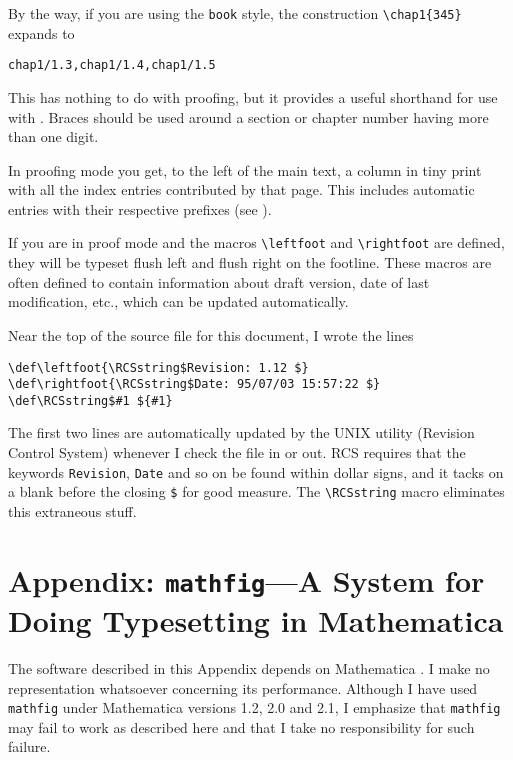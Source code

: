 By the way, if you are using the \verb+book+ style, the construction
\verb+\chap1{345}+ expands to 
\begin{verbatim}
chap1/1.3,chap1/1.4,chap1/1.5
\end{verbatim}
This has nothing to do with proofing, but it provides a useful shorthand
for use with \verb++.
Braces should be used around a section or chapter number having more
than one digit.

In proofing mode you get, to the left of the main text, a column in
tiny print with all the index entries contributed by that page.  This
includes automatic entries with their respective prefixes (see
).

If you are in proof mode and the macros \verb+\leftfoot+ and
\verb+\rightfoot+ are defined, they will be typeset flush left and
flush right on the footline.  These macros are often defined to
contain information about draft version, date of last modification,
etc., which can be updated automatically.

\begin{wizard}
Near the top of the 
source file for this document, I wrote the lines
\begin{verbatim}
\def\leftfoot{\RCSstring$Revision: 1.12 $}
\def\rightfoot{\RCSstring$Date: 95/07/03 15:57:22 $}
\def\RCSstring$#1 ${#1}
\end{verbatim}
The first two lines are automatically updated by the UNIX utility
 (Revision Control System) whenever I check the file in or
out.  RCS requires that the keywords \verb+Revision+, \verb+Date+ and
so on be found within dollar signs, and it tacks on a blank before the
closing \verb+$+ for good measure.  The \verb+\RCSstring+ macro
eliminates this extraneous stuff.
\end{wizard}

\section*{Appendix: {\mediumseries \tt mathfig}---A System for Doing Typesetting in
Mathematica} 

\begin{warning}
The software described in this Appendix depends on Mathematica
\cite{wolfram}.  I make no representation whatsoever concerning its
performance.  Although I have used \verb+mathfig+ under Mathematica
versions 1.2, 2.0 and 2.1, I emphasize that \verb+mathfig+ may fail to
work as described here and that I take no responsibility for such
failure.
\end{warning}

